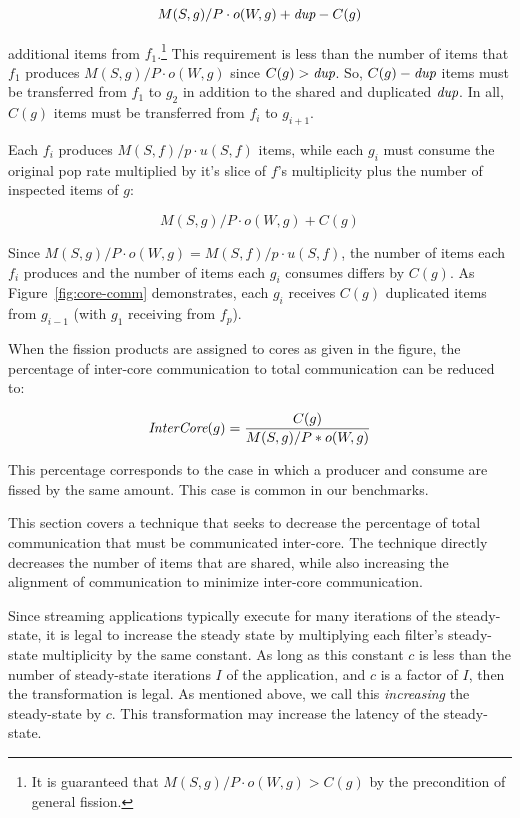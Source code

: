 \[ M(S, g)/P \cdot o(W, g) + \mbox{\it dup} - C(g)\]

\noindent additional items from $f_1$.\footnote{It is guaranteed that
  $M(S, g)/P \cdot o(W, g) > C(g)$ by the precondition of general
  fission.} This requirement is less than the number of items that
$f_1$ produces $M(S, g)/P \cdot o(W, g)$ since $C(g) > \mbox{\it dup}$. So,
$C(g) - \mbox{\it dup}$ items must be transferred from $f_1$ to $g_2$ in
addition to the shared and duplicated $\mbox{\it dup}$. In all, $C(g)$ items
must be transferred from $f_i$ to $g_{i+1}$.

 Each $f_i$ produces $M(S,f)/p
\cdot u(S,f)$ items, while each $g_i$ must consume the original pop
rate multiplied by it's slice of $f$'s multiplicity plus the number of
inspected items of $g$:

\[ M(S,g)/P \cdot o(W, g) + C(g) \]

\noindent Since $M(S,g)/P \cdot o(W, g) = M(S,f)/p
\cdot u(S,f)$, the number of items each $f_i$ produces and the number
of items each $g_i$ consumes differs by $C(g)$.
As Figure~\ref{fig:core-comm} demonstrates, each $g_i$
receives $C(g)$ duplicated items from $g_{i-1}$ (with $g_1$
receiving from $f_p$).  

When the fission products are assigned to
cores as given in the figure, the percentage of inter-core
communication to total communication can be reduced to:

\begin{equation}
\label{eq:min-dup}
\mt{InterCore}(g) = \frac{C(g)}{M(S,g) / P * o(W, g)}
\end{equation}

\noindent This percentage corresponds to the case in which a
producer and consume are fissed by the same amount.  This case is
common in our benchmarks.

This section covers a technique that seeks to decrease the percentage
of total communication that must be communicated inter-core.  The
technique directly decreases the number of items that are shared,
while also increasing the alignment of communication to minimize
inter-core communication.


Since streaming applications typically execute for
many iterations of the steady-state, it is legal to increase the
steady state by multiplying each filter's steady-state multiplicity by
the same constant.  As long as this constant $c$ is less than the number
of steady-state iterations $I$ of the application, and $c$ is a factor of
$I$, then the transformation is legal.  As mentioned above, we call
this {\it increasing} the steady-state by $c$.  This transformation
may increase the latency of the steady-state.


